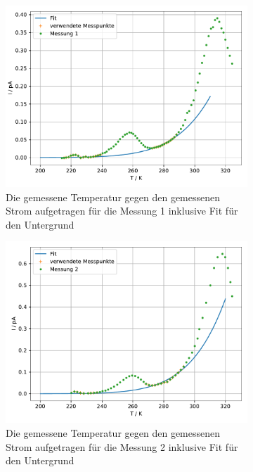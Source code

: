 \begin{figure}
  
  \centering
  \begin{subfigure}[b]{0.75\textwidth}
      \centering
      \includegraphics[width=\textwidth]{build_j/untergrund_1.pdf}
      \caption{Die gemessene Temperatur gegen den gemessenen Strom aufgetragen für die Messung 1 inklusive Fit für den Untergrund}
  \end{subfigure}
  \hfill
  \begin{subfigure}[b]{0.75\textwidth}
      \centering
      \includegraphics[width=\textwidth]{build_j/untergrund_2.pdf}
      \caption{Die gemessene Temperatur gegen den gemessenen Strom aufgetragen für die Messung 2 inklusive Fit für den Untergrund}
  \end{subfigure}
  \caption{}
  \label{fig:Untergrund}
\end{figure}

